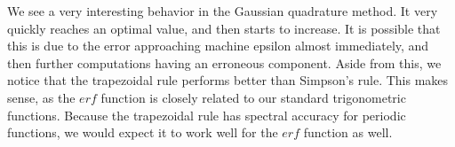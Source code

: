 \documentclass[letterpaper,10pt]{article}
\begin{document}
\begin{enumerate}
\begin{center}
\end{center}
We see a very interesting behavior in the Gaussian quadrature method. It very quickly reaches an optimal value, and then starts to increase. It is possible that this is due to the error approaching machine epsilon almost immediately, and then further computations having an erroneous component. Aside from this, we notice that the trapezoidal rule performs better than Simpson's rule. This makes sense, as the $erf$ function is closely related to our standard trigonometric functions. Because the trapezoidal rule has spectral accuracy for periodic functions, we would expect it to work well for the $erf$ function as well.
\end{enumerate}
\end{document}
